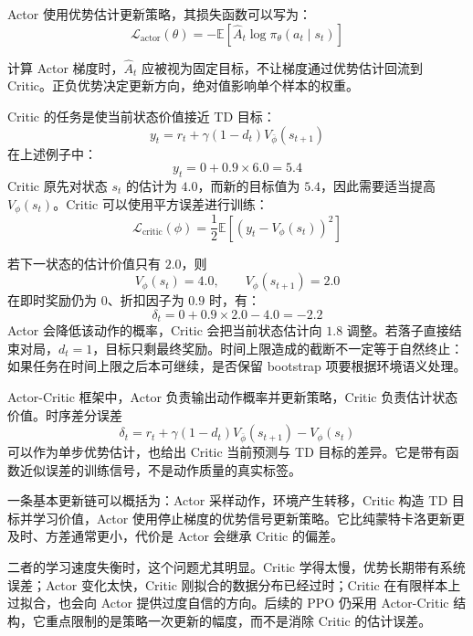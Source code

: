 \documentclass[UTF8,a4paper,zihao=-4,oneside,openany]{ctexbook}
\begin{document}
Actor 使用优势估计更新策略，其损失函数可以写为：
\begin{equation}
\mathcal{L}_{\mathrm{actor}}(\theta)
=
-
\mathbb{E}
\left[
\widehat{A}_t
\log
\pi_{\theta}(a_t\mid s_t)
\right]
\end{equation}

计算 Actor 梯度时，$\widehat A_t$ 应被视为固定目标，不让梯度通过优势估计回流到 Critic。正负优势决定更新方向，绝对值影响单个样本的权重。

Critic 的任务是使当前状态价值接近 TD 目标：
\begin{equation}
y_t=r_t+\gamma(1-d_t)V_{\bar\phi}(s_{t+1})
\end{equation}
在上述例子中：
\begin{equation}
y_t
=
0+0.9\times6.0
=
5.4
\end{equation}
Critic 原先对状态 $s_t$ 的估计为 $4.0$，而新的目标值为 $5.4$，因此需要适当提高 $V_{\phi}(s_t)$。Critic 可以使用平方误差进行训练：
\begin{equation}
\mathcal{L}_{\mathrm{critic}}(\phi)
=
\frac{1}{2}
\mathbb{E}
\left[
\left(
y_t-V_{\phi}(s_t)
\right)^2
\right]
\end{equation}

若下一状态的估计价值只有 $2.0$，则
\begin{equation}
V_{\phi}(s_t)=4.0,\qquad
V_{\phi}(s_{t+1})=2.0
\end{equation}
在即时奖励仍为 $0$、折扣因子为 $0.9$ 时，有：
\begin{equation}
\delta_t
=
0+0.9\times2.0-4.0
=
-2.2
\end{equation}
Actor 会降低该动作的概率，Critic 会把当前状态估计向 $1.8$ 调整。若落子直接结束对局，$d_t=1$，目标只剩最终奖励。时间上限造成的截断不一定等于自然终止：如果任务在时间上限之后本可继续，是否保留 bootstrap 项要根据环境语义处理。

Actor-Critic 框架中，Actor 负责输出动作概率并更新策略，Critic 负责估计状态价值。时序差分误差
  \[
  \delta_t=r_t+\gamma(1-d_t)V_{\bar\phi}(s_{t+1})-V_{\phi}(s_t)
  \]
可以作为单步优势估计，也给出 Critic 当前预测与 TD 目标的差异。它是带有函数近似误差的训练信号，不是动作质量的真实标签。

一条基本更新链可以概括为：Actor 采样动作，环境产生转移，Critic 构造 TD 目标并学习价值，Actor 使用停止梯度的优势信号更新策略。它比纯蒙特卡洛更新更及时、方差通常更小，代价是 Actor 会继承 Critic 的偏差。

二者的学习速度失衡时，这个问题尤其明显。Critic 学得太慢，优势长期带有系统误差；Actor 变化太快，Critic 刚拟合的数据分布已经过时；Critic 在有限样本上过拟合，也会向 Actor 提供过度自信的方向。后续的 PPO 仍采用 Actor-Critic 结构，它重点限制的是策略一次更新的幅度，而不是消除 Critic 的估计误差。
\end{document}
